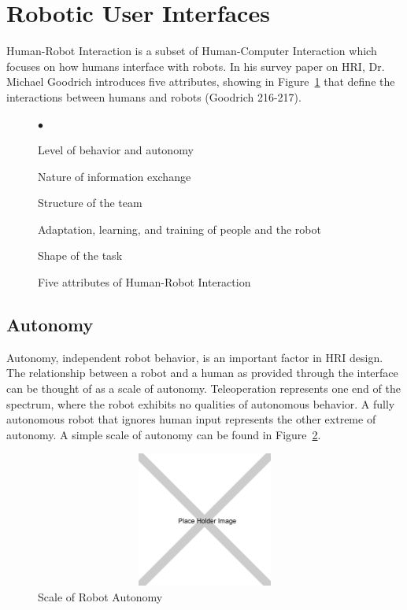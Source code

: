 \section{Robotic User Interfaces}

Human-Robot Interaction is a subset of Human-Computer Interaction which focuses on how humans interface with robots. In his survey paper on HRI, Dr. Michael Goodrich introduces five attributes, showing in Figure~\ref{fig:five-attributes} that define the interactions between humans and robots (Goodrich 216-217).

\begin{figure}[ht]
	\makebox[\textwidth]{\hrulefill}
	\begin{list}{$\bullet$}
		\item Level of behavior and autonomy
		\item Nature of information exchange
		\item Structure of the team
		\item Adaptation, learning, and training of people and the robot
		\item Shape of the task
	\end{list}
	\makebox[\textwidth]{\hrulefill}
	\caption{Five attributes of Human-Robot Interaction \label{fig:five-attributes}}
\end{figure}


\subsection{Autonomy}

Autonomy, independent robot behavior, is an important factor in HRI design. The relationship between a robot and a human as provided through the interface can be thought of as a scale of autonomy. Teleoperation represents one end of the spectrum, where the robot exhibits no qualities of autonomous behavior. A fully autonomous robot that ignores human input represents the other extreme of autonomy. A simple scale of autonomy can be found in Figure~\ref{fig:autonomy}.

\begin{figure}[ht]
\begin{center}
\includegraphics[width=5in,height=1.75in]{images/placeholder.png}
\caption{Scale of Robot Autonomy\label{fig:autonomy}}
\end{center}
\end{figure}

